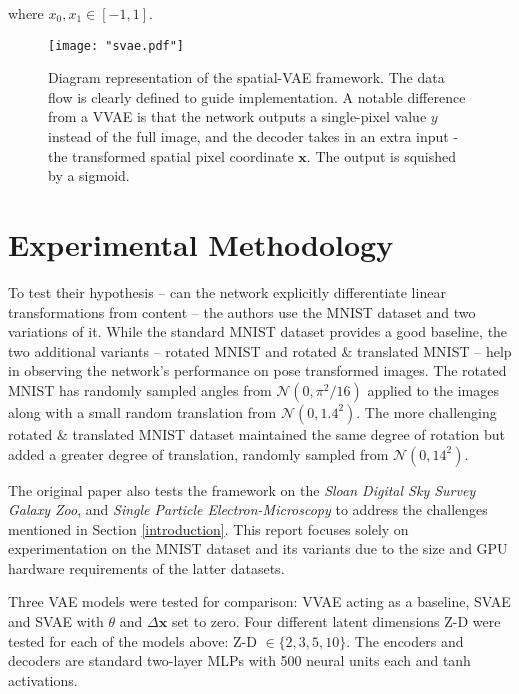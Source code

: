 where $x_0, x_1 \in [-1, 1]$.

\begin{figure}[t]
    \begin{center}
        \texttt{[image: "svae.pdf"]}
    \end{center}
    \caption{Diagram representation of the spatial-VAE framework. The data flow is clearly defined to guide implementation. A notable difference from a VVAE is that the network outputs a single-pixel value $y$ instead of the full image, and the decoder takes in an extra input - the transformed spatial pixel coordinate $\textbf{x}$. The output is squished by a sigmoid.}
    \label{fig:arch}
\end{figure}


\section{Experimental Methodology} \label{exp}

To test their hypothesis -- can the network explicitly differentiate linear transformations from content -- the authors use the MNIST dataset and two variations of it. While the standard MNIST dataset provides a good baseline, the two additional variants -- rotated MNIST and rotated \& translated MNIST -- help in observing the network's performance on pose transformed images. The rotated MNIST has randomly sampled angles from $\mathcal{N}(0, \pi^2/16)$ applied to the images along with a small random translation from $\mathcal{N}(0, 1.4^2)$. The more challenging rotated \& translated MNIST dataset maintained the same degree of rotation but added a greater degree of translation, randomly sampled from $\mathcal{N}(0, 14^2)$. 

The original paper also tests the framework on the \textit{Sloan Digital Sky Survey Galaxy Zoo}, and \textit{Single Particle Electron-Microscopy} to address the challenges mentioned in Section \ref{introduction}. This report focuses solely on experimentation on the MNIST dataset and its variants due to the size and GPU hardware requirements of the latter datasets.

Three VAE models were tested for comparison: VVAE acting as a baseline, SVAE and SVAE with $\theta$ and $\Delta \textbf{x}$ set to zero. Four different latent dimensions Z-D were tested for each of the models above: Z-D $\in \{ 2, 3, 5, 10 \}$. The encoders and decoders are standard two-layer MLPs with 500 neural units each and tanh activations. 

